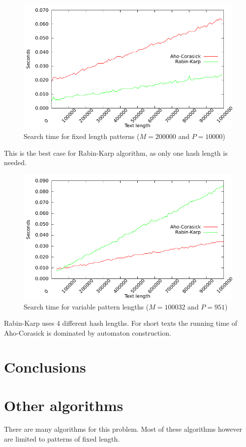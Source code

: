\documentclass[final]{beamer}
\begin{document}
\begin{poster}
\begin{figure}
\centering
 \includegraphics[width=25cm]{text_len_fixed.pdf}
\caption{
Search time for fixed length patterns ($M = 200000$ and $P = 10000$)
}
\label{fig:text_len_fixed}
\end{figure}
This is the best case for Rabin-Karp algorithm, as only one hash length is needed.

\begin{figure}
\centering
\includegraphics[width=25cm]{text_len.pdf}
\caption{
Search time for variable pattern lengths ($M = 100032$ and $P = 951$)
}
\label{fig:text_len_var}
\end{figure}
\begin{small}
Rabin-Karp uses 4 different hash lengths.
\newline
\newline
For short texts the running time of Aho-Corasick is dominated by automaton construction.
\end{small}

\section{Conclusions}
\section{Other algorithms}
There are many algorithms for this problem.
Most of these algorithms however are limited to patterns of fixed length.

\end{poster}
\end{document}
